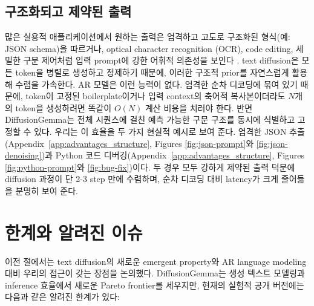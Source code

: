 \documentclass[11pt, a4paper, logo, copyright, gdm]{google}
\begin{document}
\subsection{구조화되고 제약된 출력}
많은 실용적 애플리케이션에서 원하는 출력은 엄격하고 고도로 구조화된 형식(예: JSON schema)을 따르거나, optical character recognition (OCR), code editing, 세밀한 구문 제어처럼 입력 prompt에 강한 어휘적 의존성을 보인다 \citep{chen2023textdiffuser, li2022diffusionlm}. text diffusion은 모든 token을 병렬로 생성하고 정제하기 때문에, 이러한 구조적 prior를 자연스럽게 활용해 수렴을 가속한다. AR 모델은 이런 능력이 없다. 엄격한 순차 디코딩에 묶여 있기 때문에, token이 고정된 boilerplate이거나 입력 context의 축어적 복사본이더라도 $N$개의 token을 생성하려면 똑같이 $O(N)$ 계산 비용을 치러야 한다. 반면 DiffusionGemma는 전체 시퀀스에 걸친 예측 가능한 구문 구조를 동시에 식별하고 고정할 수 있다. 우리는 이 효율을 두 가지 현실적 예시로 보여 준다. 엄격한 JSON 추출(Appendix~\ref{app:advantages_structure}, Figures \ref{fig:json-prompt}와 \ref{fig:json-denoising})과 Python 코드 디버깅(Appendix~\ref{app:advantages_structure}, Figures \ref{fig:python-prompt}와 \ref{fig:bug-fix})이다. 두 경우 모두 강하게 제약된 출력 덕분에 diffusion 과정이 단 2-3 step 만에 수렴하며, 순차 디코딩 대비 latency가 크게 줄어듦을 분명히 보여 준다.

\section{한계와 알려진 이슈} \label{sec:limitations}

이전 절에서는 text diffusion의 새로운 emergent property와 AR language modeling 대비 우리의 접근이 갖는 장점을 논의했다. DiffusionGemma는 생성 텍스트 모델링과 inference 효율에서 새로운 Pareto frontier를 세우지만, 현재의 실험적 공개 버전에는 다음과 같은 알려진 한계가 있다:
\end{document}

